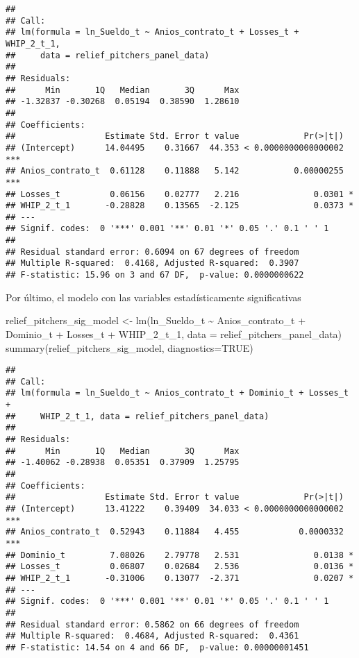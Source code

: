 \documentclass[
]{article}
\newenvironment{Shaded}{\begin{snugshade}}{\end{snugshade}}
\newcommand{\AttributeTok}[1]{\textcolor[rgb]{0.77,0.63,0.00}{#1}}
\newcommand{\ConstantTok}[1]{\textcolor[rgb]{0.00,0.00,0.00}{#1}}
\newcommand{\FunctionTok}[1]{\textcolor[rgb]{0.00,0.00,0.00}{#1}}
\newcommand{\NormalTok}[1]{#1}
\newcommand{\OtherTok}[1]{\textcolor[rgb]{0.56,0.35,0.01}{#1}}
\newcommand{\SpecialCharTok}[1]{\textcolor[rgb]{0.00,0.00,0.00}{#1}}
\begin{document}
\begin{verbatim}
## 
## Call:
## lm(formula = ln_Sueldo_t ~ Anios_contrato_t + Losses_t + WHIP_2_t_1, 
##     data = relief_pitchers_panel_data)
## 
## Residuals:
##      Min       1Q   Median       3Q      Max 
## -1.32837 -0.30268  0.05194  0.38590  1.28610 
## 
## Coefficients:
##                  Estimate Std. Error t value             Pr(>|t|)    
## (Intercept)      14.04495    0.31667  44.353 < 0.0000000000000002 ***
## Anios_contrato_t  0.61128    0.11888   5.142           0.00000255 ***
## Losses_t          0.06156    0.02777   2.216               0.0301 *  
## WHIP_2_t_1       -0.28828    0.13565  -2.125               0.0373 *  
## ---
## Signif. codes:  0 '***' 0.001 '**' 0.01 '*' 0.05 '.' 0.1 ' ' 1
## 
## Residual standard error: 0.6094 on 67 degrees of freedom
## Multiple R-squared:  0.4168, Adjusted R-squared:  0.3907 
## F-statistic: 15.96 on 3 and 67 DF,  p-value: 0.0000000622
\end{verbatim}

Por último, el modelo con las variables estadísticamente significativas

\begin{Shaded}
\begin{Highlighting}[]
\NormalTok{relief\_pitchers\_sig\_model }\OtherTok{\textless{}{-}} \FunctionTok{lm}\NormalTok{(ln\_Sueldo\_t }\SpecialCharTok{\textasciitilde{}}\NormalTok{ Anios\_contrato\_t }\SpecialCharTok{+}\NormalTok{ Dominio\_t }\SpecialCharTok{+} 
\NormalTok{                                              Losses\_t }\SpecialCharTok{+}\NormalTok{ WHIP\_2\_t\_1, }
                                              \AttributeTok{data =}\NormalTok{ relief\_pitchers\_panel\_data)}
\FunctionTok{summary}\NormalTok{(relief\_pitchers\_sig\_model, }\AttributeTok{diagnostics=}\ConstantTok{TRUE}\NormalTok{)}
\end{Highlighting}
\end{Shaded}

\begin{verbatim}
## 
## Call:
## lm(formula = ln_Sueldo_t ~ Anios_contrato_t + Dominio_t + Losses_t + 
##     WHIP_2_t_1, data = relief_pitchers_panel_data)
## 
## Residuals:
##      Min       1Q   Median       3Q      Max 
## -1.40062 -0.28938  0.05351  0.37909  1.25795 
## 
## Coefficients:
##                  Estimate Std. Error t value             Pr(>|t|)    
## (Intercept)      13.41222    0.39409  34.033 < 0.0000000000000002 ***
## Anios_contrato_t  0.52943    0.11884   4.455            0.0000332 ***
## Dominio_t         7.08026    2.79778   2.531               0.0138 *  
## Losses_t          0.06807    0.02684   2.536               0.0136 *  
## WHIP_2_t_1       -0.31006    0.13077  -2.371               0.0207 *  
## ---
## Signif. codes:  0 '***' 0.001 '**' 0.01 '*' 0.05 '.' 0.1 ' ' 1
## 
## Residual standard error: 0.5862 on 66 degrees of freedom
## Multiple R-squared:  0.4684, Adjusted R-squared:  0.4361 
## F-statistic: 14.54 on 4 and 66 DF,  p-value: 0.00000001451
\end{verbatim}
\end{document}
